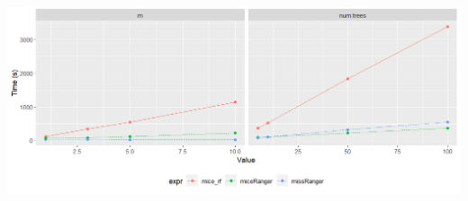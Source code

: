 \documentclass[20pt,margin=1in,innermargin=-4.5in,blockverticalspace=-0.25in]{tikzposter}
\begin{document}
\begin{columns}
{        \begin{center}
            \vspace{-0.5em}
            \begin{tikzfigure}[]
                \includegraphics[width=1\linewidth]{plot_comptime_m_ntree_combined.png}
            \end{tikzfigure}
        \end{center}
        \vspace{-2em}
        
        \vspace{-1em}

        
    }


        \block{}{

}
\end{columns}
\end{document}

